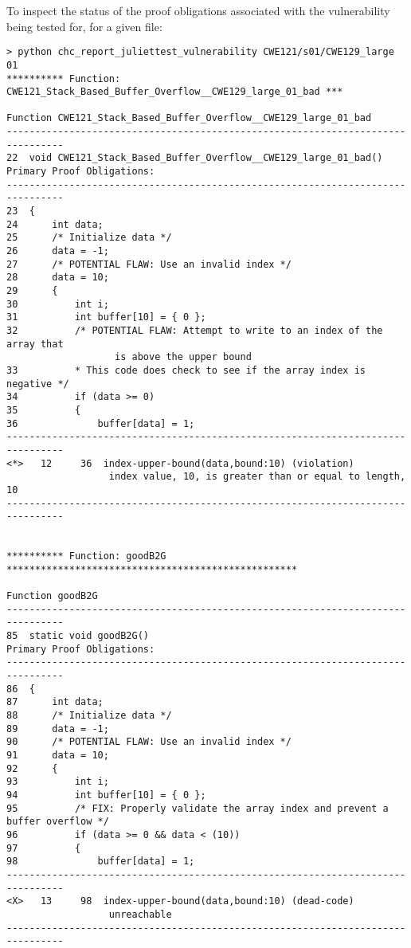 \documentclass[11pt]{article}
\begin{document}
To inspect the status of the proof obligations associated with the vulnerability being
tested for, for a given file:
\begin{small}
\begin{verbatim}
> python chc_report_juliettest_vulnerability CWE121/s01/CWE129_large 01
********** Function: CWE121_Stack_Based_Buffer_Overflow__CWE129_large_01_bad ***

Function CWE121_Stack_Based_Buffer_Overflow__CWE129_large_01_bad
--------------------------------------------------------------------------------
22  void CWE121_Stack_Based_Buffer_Overflow__CWE129_large_01_bad()
Primary Proof Obligations:
--------------------------------------------------------------------------------
23  {
24      int data;
25      /* Initialize data */
26      data = -1;
27      /* POTENTIAL FLAW: Use an invalid index */
28      data = 10;
29      {
30          int i;
31          int buffer[10] = { 0 };
32          /* POTENTIAL FLAW: Attempt to write to an index of the array that 
                   is above the upper bound
33          * This code does check to see if the array index is negative */
34          if (data >= 0)
35          {
36              buffer[data] = 1;
--------------------------------------------------------------------------------
<*>   12     36  index-upper-bound(data,bound:10) (violation)
                  index value, 10, is greater than or equal to length, 10
--------------------------------------------------------------------------------


********** Function: goodB2G ***************************************************

Function goodB2G
--------------------------------------------------------------------------------
85  static void goodB2G()
Primary Proof Obligations:
--------------------------------------------------------------------------------
86  {
87      int data;
88      /* Initialize data */
89      data = -1;
90      /* POTENTIAL FLAW: Use an invalid index */
91      data = 10;
92      {
93          int i;
94          int buffer[10] = { 0 };
95          /* FIX: Properly validate the array index and prevent a buffer overflow */
96          if (data >= 0 && data < (10))
97          {
98              buffer[data] = 1;
--------------------------------------------------------------------------------
<X>   13     98  index-upper-bound(data,bound:10) (dead-code)
                  unreachable
--------------------------------------------------------------------------------



\end{verbatim}
\end{small}
\end{document}
